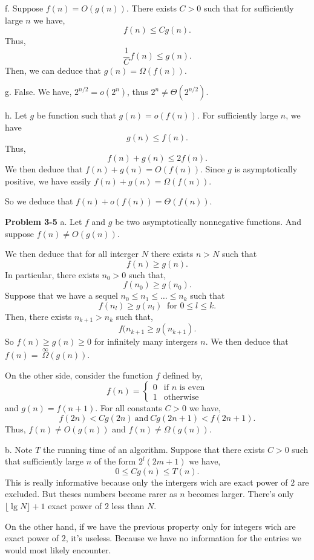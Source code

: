 \documentclass[a4paper,12pt]{article}
\newcommand{\newprob}[1]
{\bigskip \noindent \textbf{Problem #1} \newline}
\newcommand{\subpar}[1]
{\medskip \noindent #1.}
\begin{document}
\subpar{f} Suppose $f(n) = O(g(n))$.  There exists $C > 0$ such that
for sufficiently large $n$ we have,
\[ f(n) \le C g(n).\]
Thus,
\[ \frac{1}{C} f(n) \le g(n).\]
Then, we can deduce that $g(n) = \Omega(f(n))$.

\subpar{g}  False. We have, $2^{n/2} = o(2^n)$, thus $2^n \not=
  \Theta(2^{n/2})$.

\subpar{h}  Let $g$ be function such that $g(n) = o(f(n))$.  For
sufficiently large $n$, we have
\[ g(n) \le f(n).\]
Thus,
\[ f(n) + g(n) \le 2f(n).\]
We then deduce that $f(n) + g(n) = O(f(n))$.  Since $g$ is
asymptotically positive, we have easily $f(n) + g(n) = \Omega(f(n))$.

So we deduce that $f(n) + o(f(n)) = \Theta(f(n))$.

\newprob{3-5}
\subpar{a} Let $f$ and $g$ be two asymptotically nonnegative
functions.  And suppose $f(n) \not= O(g(n))$.

We then deduce that for all interger $N$ there exists $n > N$ such that
\[ f(n) \ge g(n).\]
In particular, there exists $n_0 > 0$ such that,
\[ f(n_0) \ge g(n_0).\]
Suppose that we have a sequel $n_0\le n_1\le \ldots\le n_k$ such that
\[ f(n_l) \ge g(n_l)\ \mbox{ for $0 \le l \le k$}.\]
Then, there exists $n_{k+1} > n_k$ such that,
\[ f(n_{k+1} \ge g(n_{k+1}).\]
So $f(n) \ge g(n) \ge 0$ for infinitely many intergers $n$.  We then
deduce that $f(n) =\ \stackrel{\infty}{\Omega}(g(n))$.

\medskip
On the other side, consider the function $f$ defined by,
\[ f(n) = \left\{
\begin{array}{cl}
0 & \mbox{if $n$ is even} \\
1 & \mbox{otherwise}
\end{array} \right. \]
and $g(n) = f(n+1)$.  For all constants $C > 0$ we have,
\[ f(2n) < Cg(2n)\ \mbox{and}\ Cg(2n+1) < f(2n+1).\]
Thus, $f(n) \not= O(g(n))$ and $f(n) \not= \Omega(g(n))$.

\subpar{b}  Note $T$ the running time of an algorithm.  Suppose that
there exists $C > 0$ such that sufficiently large $n$ of the form 
$2^l(2m+1)$ we have,
\[ 0 \le Cg(n) \le T(n).\]
This is really informative because only the intergers wich are exact
power of $2$ are excluded.  But theses numbers become rarer as $n$
becomes larger.  There's only $\lfloor \lg N\rfloor + 1$ exact power
of $2$ less than $N$.

On the other hand, if we have the previous property only for integers
wich are exact power of $2$, it's useless.  Because we have no
information for the entries we would most likely encounter.
\end{document}
